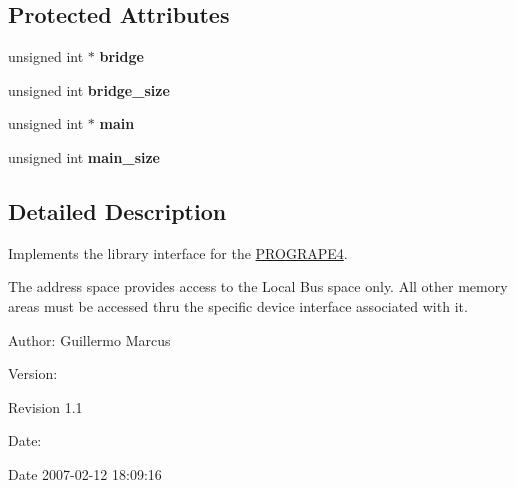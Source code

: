 \subsection*{Protected Attributes}
\begin{CompactItemize}
\item 
\hypertarget{classmprace_1_1PROGRAPE4_p0}{
unsigned int $\ast$ {\bf bridge}}
\label{classmprace_1_1PROGRAPE4_p0}

\item 
\hypertarget{classmprace_1_1PROGRAPE4_p1}{
unsigned int {\bf bridge\_\-size}}
\label{classmprace_1_1PROGRAPE4_p1}

\item 
\hypertarget{classmprace_1_1PROGRAPE4_p2}{
unsigned int $\ast$ {\bf main}}
\label{classmprace_1_1PROGRAPE4_p2}

\item 
\hypertarget{classmprace_1_1PROGRAPE4_p3}{
unsigned int {\bf main\_\-size}}
\label{classmprace_1_1PROGRAPE4_p3}

\end{CompactItemize}


\subsection{Detailed Description}
Implements the library interface for the \hyperlink{classmprace_1_1PROGRAPE4}{PROGRAPE4}. 

The address space provides access to the Local Bus space only. All other memory areas must be accessed thru the specific device interface associated with it.

\begin{Desc}
\item[Author:]Guillermo Marcus \end{Desc}
\begin{Desc}
\item[Version:]\begin{Desc}
\item[Revision]1.1 \end{Desc}
\end{Desc}
\begin{Desc}
\item[Date:]\begin{Desc}
\item[Date]2007-02-12 18:09:16 \end{Desc}
\end{Desc}




